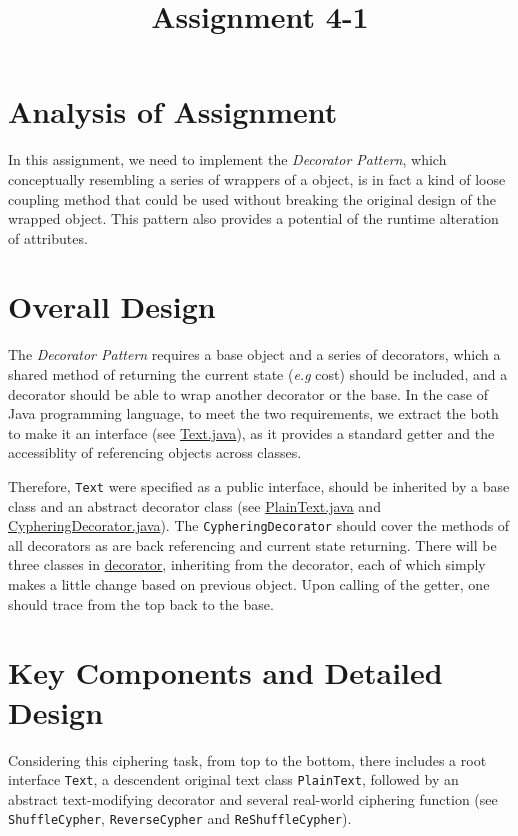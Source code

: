 \documentclass[a4paper]{article}
\title{Assignment 4-1}
\makeatletter
\renewcommand{\maketitle}{\bgroup\setlength{\parindent}{0pt}
    \begin{center}
        \textbf{\huge\@title}
    \end{center}
\egroup}
\makeatother
\begin{document}
\maketitle

\section{Analysis of Assignment}

In this assignment, we need to implement the \textit{Decorator Pattern}, which conceptually resembling a series of wrappers
of a object, is in fact a kind of loose coupling method that could be used without breaking the original design of the wrapped object.
This pattern also provides a potential of the runtime alteration of attributes.

\section{Overall Design}

The \textit{Decorator Pattern} requires a base object and a series of decorators, which a shared method of returning the current
state (\textit{e.g} cost) should be included, and a decorator should be able to wrap another decorator or the base. In the case of Java
programming language, to meet the two requirements, we extract the both to make it an interface (see \underline{Text.java}), as it provides
a standard getter and the accessiblity of referencing objects across classes.

Therefore, \texttt{Text} were specified as a public interface, should be inherited by a base class and an abstract decorator class (see
\underline{PlainText.java} and \underline{CypheringDecorator.java}). The \texttt{CypheringDecorator} should cover the methods of all decorators
as are back referencing and current state returning. There will be three classes in \underline{decorator}, inheriting from the decorator, each of which simply makes a little
change based on previous object. Upon calling of the getter, one should trace from the top back to the base.

\section{Key Components and Detailed Design}

Considering this ciphering task, from top to the bottom, there includes a root interface \texttt{Text}, a descendent original text class \texttt{PlainText}, followed by
an abstract text-modifying decorator and several real-world ciphering function (see \texttt{ShuffleCypher}, \texttt{ReverseCypher} and \texttt{ReShuffleCypher}).
\end{document}
